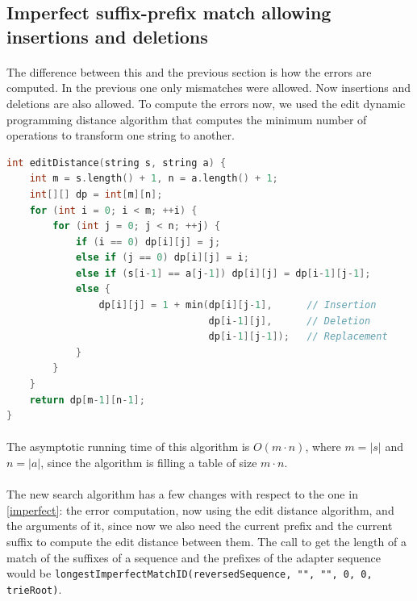 \documentclass[a4paper,10pt]{article}
\begin{document}
\subsection{Imperfect suffix-prefix match allowing insertions and deletions}

\paragraph{} The difference between this and the previous section is how the errors are computed. In the previous one only mismatches were allowed. Now insertions and deletions are also allowed.
To compute the errors now, we used the edit dynamic programming distance algorithm that computes the minimum number of operations to transform one string to another.


\begin{lstlisting}[label=dp, language=c++, caption=Dynamic programming algorithm to calculate the edit distance between two strings]
int editDistance(string s, string a) {
    int m = s.length() + 1, n = a.length() + 1;
    int[][] dp = int[m][n];
    for (int i = 0; i < m; ++i) {
        for (int j = 0; j < n; ++j) {
            if (i == 0) dp[i][j] = j;
            else if (j == 0) dp[i][j] = i;
            else if (s[i-1] == a[j-1]) dp[i][j] = dp[i-1][j-1];
            else {
                dp[i][j] = 1 + min(dp[i][j-1],      // Insertion
                                   dp[i-1][j],      // Deletion
                                   dp[i-1][j-1]);   // Replacement
            }
        }
    }
    return dp[m-1][n-1];
}
\end{lstlisting}

\paragraph{} The asymptotic running time of this algorithm is $O(m\cdot n)$, where $m = |s|$ and $n = |a|$, since the algorithm is filling a table of size $m\cdot n$.

\paragraph{} The new search algorithm has a few changes with respect to the one in \ref{imperfect}: the error computation, now using the edit distance algorithm, and the arguments of it, since now we also need the current prefix and the current suffix to compute the edit distance between them. The call to get the length of a match of the suffixes of a sequence and the prefixes of the adapter sequence would be \texttt{longestImperfectMatchID(reversedSequence, "", "", 0, 0, trieRoot)}.
\end{document}
